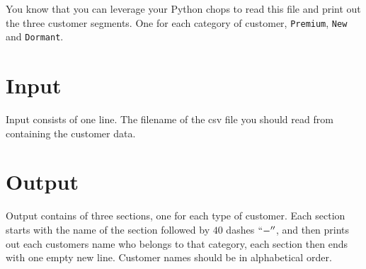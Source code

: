 You know that you can leverage your Python chops to read this file and print out the three customer segments.
One for each category of customer, \texttt{Premium}, \texttt{New} and \texttt{Dormant}.

\section*{Input}
Input consists of one line.
The filename of the csv file you should read from containing the customer data.

\section*{Output}
Output contains of three sections, one for each type of customer.
Each section starts with the name of the section followed by $40$ dashes \(``-''\),
and then prints out each customers name who belongs to that category,
each section then ends with one empty new line.
Customer names should be in alphabetical order.


